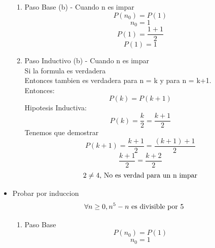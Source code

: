 \documentclass[10pt,a4paper]{article}
\begin{document}
\begin{itemize}
\begin{enumerate}
				\item Paso Base (b) - Cuando n es impar
					\begin{equation*}
						P(n_{0}) = P(1)
					\end{equation*}
					\begin{equation*}
						n_{0} = 1
					\end{equation*}
					\begin{equation*}
						P(1) = \frac{1+1}{2}
					\end{equation*}
					\begin{equation*}
						P(1) = 1
					\end{equation*}
				\item Paso Inductivo (b)  - Cuando n es impar\\
					Si la formula es verdadera\\
					Entonces tambien es verdadera para n = k y para n = k+1. \\
					Entonces:
					\begin{equation*}
						P(k) = P(k+1)
					\end{equation*}
					Hipotesis Inductiva:
					\begin{equation*}
						P(k) = \frac{k}{2} = \frac{k+1}{2}
					\end{equation*}
					Tenemos que demostrar 
					\begin{equation*}
						P(k+1) = \frac{k+1}{2} = \frac{(k+1)+1}{2}
					\end{equation*}
					\begin{equation*}
						\frac{k+1}{2} = \frac{k+2}{2}
					\end{equation*}
					\begin{equation*}
						2 \neq  4 \textup{, No es verdad para un n impar}
					\end{equation*}
			\end{enumerate}
		\item Probar por induccion 
			\begin{equation*}
				\forall n \geq 0, n^{5}-n \textup{ es divisible por 5}
			\end{equation*}
			\begin{enumerate}
				\item Paso Base
					\begin{equation*}
						P(n_{0}) = P(1)
					\end{equation*}
					\begin{equation*}
						n_{0} = 1
					\end{equation*}
					\begin{equation*}

\end{equation*}
\end{enumerate}
\end{itemize}
\end{document}
